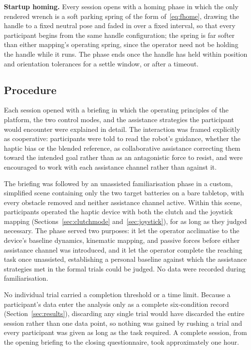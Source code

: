 \documentclass[12pt,a4paper,twoside,openright]{report}
\begin{document}
\textbf{Startup homing.}
\label{sec:homing}
Every session opens with a homing phase in which the only rendered wrench is a soft parking spring of the form of~\eqref{eq:fhome}, drawing the handle to a fixed neutral pose and faded in over a fixed interval, so that every participant begins from the same handle configuration; the spring is far softer than either mapping's operating spring, since the operator need not be holding the handle while it runs. The phase ends once the handle has held within position and orientation tolerances for a settle window, or after a timeout.

\subsection{Procedure}
\label{sec:studyprocedure}

Each session opened with a briefing in which the operating principles of the platform, the two control modes, and the assistance strategies the participant would encounter were explained in detail. The interaction was framed explicitly as cooperative: participants were told to read the robot's guidance, whether the haptic bias or the blended reference, as collaborative assistance correcting them toward the intended goal rather than as an antagonistic force to resist, and were encouraged to work with each assistance channel rather than against it.

The briefing was followed by an unassisted familiarisation phase in a custom, simplified scene containing only the two target batteries on a bare tabletop, with every obstacle removed and neither assistance channel active. Within this scene, participants operated the haptic device with both the clutch and the joystick mapping (Sections~\ref{sec:clutchmode} and~\ref{sec:joystick}), for as long as they judged necessary. The phase served two purposes: it let the operator acclimatise to the device's baseline dynamics, kinematic mapping, and passive forces before either assistance channel was introduced, and it let the operator complete the reaching task once unassisted, establishing a personal baseline against which the assistance strategies met in the formal trials could be judged. No data were recorded during familiarisation.

No individual trial carried a completion threshold or a time limit. Because a participant's data enter the analysis only as a complete six-condition record (Section~\ref{sec:results}), discarding any single trial would have discarded the entire session rather than one data point, so nothing was gained by rushing a trial and every participant was given as long as the task required. A complete session, from the opening briefing to the closing questionnaire, took approximately one hour.
\end{document}

